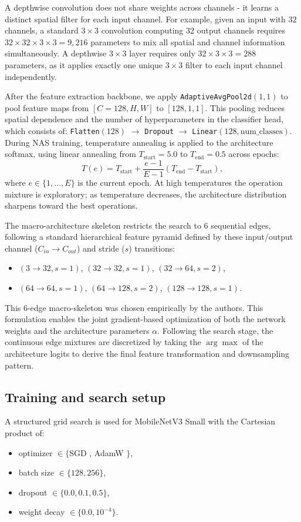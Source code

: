 \documentclass[cameraready]{Interspeech}
\begin{document}
A depthwise convolution does not share weights across channels - it learns a distinct spatial filter for each input channel. For example, given an input with $32$ channels, a standard $3\times3$ convolution computing $32$ output channels requires $32 \times 32 \times 3 \times 3 = 9{,}216$ parameters to mix all spatial and channel information simultaneously. A depthwise $3\times3$ layer requires only $32 \times 3 \times 3 = 288$ parameters, as it applies exactly one unique $3\times3$ filter to each input channel independently.

After the feature extraction backbone, we apply \texttt{AdaptiveAvgPool2d}$(1,1)$ to pool feature maps from $[C=128, H, W]$ to $[128, 1, 1]$. This pooling reduces spatial dependence and the number of hyperparameters in the classifier head, which consists of: \texttt{Flatten}$(128)$ $\rightarrow$ \texttt{Dropout} $\rightarrow$ \texttt{Linear}$(128, \text{num\_classes})$. During NAS training, temperature annealing is applied to the architecture softmax, using linear annealing from $T_{\text{start}} = 5.0$ to $T_{\text{end}} = 0.5$ across epochs:
\[
T(e) = T_{\text{start}} + \frac{e-1}{E-1} \left(T_{\text{end}} - T_{\text{start}}\right),
\]
where $e \in \{1, \ldots, E\}$ is the current epoch. At high temperatures the operation mixture is exploratory; as temperature decreases, the architecture distribution sharpens toward the best operations.

The macro-architecture skeleton restricts the search to $6$ sequential edges, following a standard hierarchical feature pyramid defined by these input/output channel ($C_{in} \rightarrow C_{out}$) and stride ($s$) transitions:
\begin{itemize}
    \item $(3\rightarrow32, s=1)$, $(32\rightarrow32, s=1)$, $(32\rightarrow64, s=2)$,
    \item $(64\rightarrow64, s=1)$, $(64\rightarrow128, s=2)$, $(128\rightarrow128, s=1)$.
\end{itemize}
This 6-edge macro-skeleton was chosen empirically by the authors. This formulation enables the joint gradient-based optimization of both the network weights and the architecture parameters $\alpha$. Following the search stage, the continuous edge mixtures are discretized by taking the $\arg\max$ of the architecture logits to derive the final feature transformation and downsampling pattern.

\subsection{Training and search setup}
A structured grid search is used for MobileNetV3 Small with the Cartesian product of:
\begin{itemize}
    \item optimizer $\in \{$SGD \cite{bottou2010large}, AdamW \cite{adamw}$\}$,
    \item batch size $\in \{128, 256\}$,
    \item dropout $\in \{0.0, 0.1, 0.5\}$,
    \item weight decay $\in \{0.0, 10^{-4}\}$.
\end{itemize}
\end{document}
